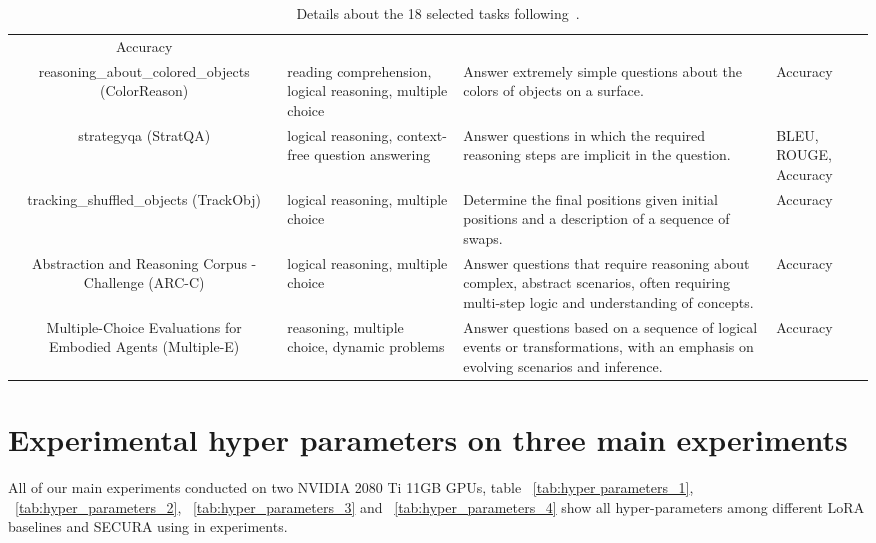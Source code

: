 \begin{table*}[!h]
{\begin{tabular}{cp{3.5cm}p{7cm}p{2.8cm}}
  Accuracy \\
reasoning\_about\_colored\_objects (ColorReason) &
  reading comprehension, logical reasoning, multiple choice &
  Answer extremely simple questions about the colors of objects on a surface. &
  Accuracy \\
strategyqa (StratQA) &
  logical reasoning, context-free question answering &
  Answer questions in which the required reasoning steps are implicit in the question. &
  BLEU, ROUGE, Accuracy \\
tracking\_shuffled\_objects (TrackObj) &
  logical reasoning, multiple choice &
  Determine the final positions given initial positions and a description of a sequence of swaps. &
  Accuracy \\
Abstraction and Reasoning Corpus - Challenge (ARC-C) &
  logical reasoning, multiple choice &
  Answer questions that require reasoning about complex, abstract scenarios, often requiring multi-step logic and understanding of concepts. &
  Accuracy \\
Multiple-Choice Evaluations for Embodied Agents (Multiple-E) &
  reasoning, multiple choice, dynamic problems &
  Answer questions based on a sequence of logical events or transformations, with an emphasis on evolving scenarios and inference. &
  Accuracy \\
\bottomrule
\end{tabular}}
\caption{Details about the 18 selected tasks following~\cite{zhang2025dlploraefficienttaskspecificlora}.}
\label{tab:18_tasks_details}
\end{table*}

\section{Experimental hyper parameters on three main experiments}\label{app:hyper_param}
All of our main experiments conducted on two NVIDIA 2080 Ti 11GB GPUs, table  ~\ref{tab:hyper parameters_1}, ~\ref{tab:hyper_parameters_2}, ~\ref{tab:hyper_parameters_3} and  ~\ref{tab:hyper_parameters_4} show all hyper-parameters among different LoRA baselines and SECURA using in experiments.

